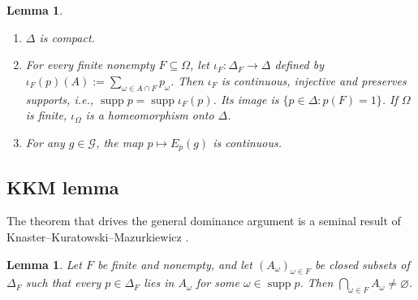 \documentclass[11pt]{article}
\newtheorem{lemma}[theorem]{Lemma}
\theoremstyle{definition}
\theoremstyle{remark}
\newcommand{\G}{\mathcal G}
\newcommand{\supp}{\operatorname{supp}}
\begin{document}
\begin{lemma}\label{lem:prob}
\leavevmode
\begin{enumerate}[label=(\alph*)]
\item $\Delta$ is compact.
\item For every finite nonempty $F\subseteq\Omega$, let $\iota_F:\Delta_F\to\Delta$ defined by $\iota_F(p)(A):=\sum_{\omega\in A\cap F}p_\omega$. Then $\iota_F$ is continuous, injective and preserves supports, \textit{i.e.}, $\supp p = \supp \iota_F(p)$. Its image is $\{p\in\Delta:p(F)=1\}$. If $\Omega$ is finite, $\iota_\Omega$ is a homeomorphism onto $\Delta$.
\item For any $g\in\G$, the map $p\mapsto E_p(g)$ is continuous. 
\end{enumerate}
\end{lemma}



\subsection{KKM lemma}\label{sec:kkm}

The theorem that drives the general dominance argument is a seminal result of Knaster--Kuratowski--Mazurkiewicz {\cite{KKM1929}}.

\begin{lemma}\label{lem:kkm}
Let $F$ be finite and nonempty, and let $(A_\omega)_{\omega\in F}$ be closed subsets of $\Delta_F$ such that every $p\in\Delta_F$ lies in $A_\omega$ for some $\omega\in\supp p$. Then $\bigcap_{\omega\in F}A_\omega\ne\varnothing$.
\end{lemma}

\end{document}
